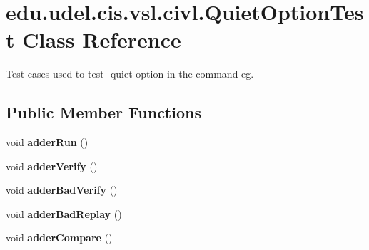\hypertarget{classedu_1_1udel_1_1cis_1_1vsl_1_1civl_1_1QuietOptionTest}{}\section{edu.\+udel.\+cis.\+vsl.\+civl.\+Quiet\+Option\+Test Class Reference}
\label{classedu_1_1udel_1_1cis_1_1vsl_1_1civl_1_1QuietOptionTest}


Test cases used to test -\/quiet option in the command eg.  


\subsection*{Public Member Functions}
\begin{DoxyCompactItemize}
\item 
\hypertarget{classedu_1_1udel_1_1cis_1_1vsl_1_1civl_1_1QuietOptionTest_ae4ded31615662fcb515f194b8251c639}{}void {\bfseries adder\+Run} ()\label{classedu_1_1udel_1_1cis_1_1vsl_1_1civl_1_1QuietOptionTest_ae4ded31615662fcb515f194b8251c639}

\item 
\hypertarget{classedu_1_1udel_1_1cis_1_1vsl_1_1civl_1_1QuietOptionTest_a788156355c78574672076fcfae723328}{}void {\bfseries adder\+Verify} ()\label{classedu_1_1udel_1_1cis_1_1vsl_1_1civl_1_1QuietOptionTest_a788156355c78574672076fcfae723328}

\item 
\hypertarget{classedu_1_1udel_1_1cis_1_1vsl_1_1civl_1_1QuietOptionTest_ab553c376c3da8611a8236f633f812a45}{}void {\bfseries adder\+Bad\+Verify} ()\label{classedu_1_1udel_1_1cis_1_1vsl_1_1civl_1_1QuietOptionTest_ab553c376c3da8611a8236f633f812a45}

\item 
\hypertarget{classedu_1_1udel_1_1cis_1_1vsl_1_1civl_1_1QuietOptionTest_ad0549a09378d600f67e861d51982f10d}{}void {\bfseries adder\+Bad\+Replay} ()\label{classedu_1_1udel_1_1cis_1_1vsl_1_1civl_1_1QuietOptionTest_ad0549a09378d600f67e861d51982f10d}

\item 
\hypertarget{classedu_1_1udel_1_1cis_1_1vsl_1_1civl_1_1QuietOptionTest_a53b08f243db748eee86bdc98daf98e52}{}void {\bfseries adder\+Compare} ()\label{classedu_1_1udel_1_1cis_1_1vsl_1_1civl_1_1QuietOptionTest_a53b08f243db748eee86bdc98daf98e52}

\end{DoxyCompactItemize}


